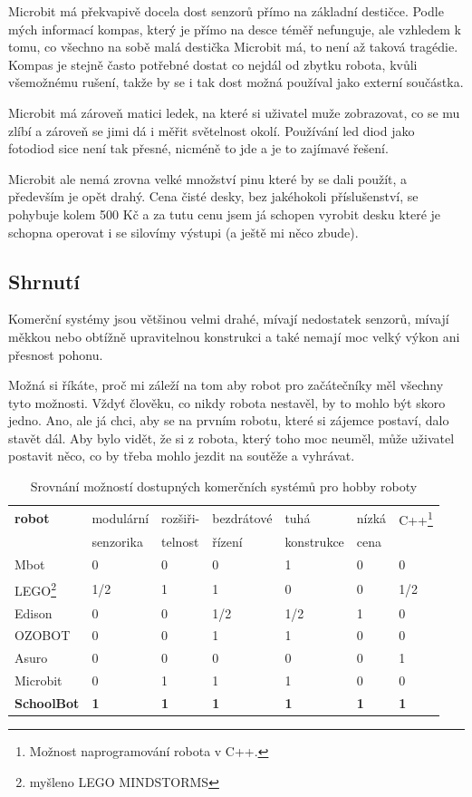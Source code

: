 \documentclass{template/socthesis}
\begin{document}
Microbit má překvapivě docela dost senzorů přímo na základní destičce. Podle mých informací kompas, který je přímo na desce téměř nefunguje, ale vzhledem k tomu, co všechno na sobě malá destička Microbit má, to není až taková tragédie. Kompas je stejně často potřebné dostat co nejdál od zbytku robota, kvůli všemožnému rušení, takže by se i tak dost možná používal jako externí součástka.

Microbit má zároveň matici ledek, na které si uživatel muže zobrazovat, co se mu zlíbí a zároveň se jimi dá i měřit světelnost okolí. Používání led diod jako fotodiod sice není tak přesné, nicméně to jde a je to zajímavé řešení.

Microbit ale nemá zrovna velké množství pinu které by se dali použít, a především je opět drahý. Cena čisté desky, bez jakéhokoli příslušenství, se pohybuje kolem 500 Kč a za tutu cenu jsem já schopen vyrobit desku které je schopna operovat i se silovímy výstupi (a ještě mi něco zbude).


\subsection{Shrnutí}
Komerční systémy jsou většinou velmi drahé, mívají nedostatek senzorů, mívají měkkou nebo obtížně upravitelnou konstrukci a také nemají moc velký výkon ani přesnost pohonu.

Možná si říkáte, proč mi záleží na tom aby robot pro začátečníky měl všechny tyto možnosti. Vždyť člověku, co nikdy robota nestavěl, by to mohlo být skoro jedno. Ano, ale já chci, aby se na prvním robotu, které si zájemce postaví, dalo stavět dál. Aby bylo vidět, že si z robota, který toho moc neuměl, může uživatel postavit něco, co by třeba mohlo jezdit na soutěže a vyhrávat. %

\begin{table}[h]
	\centering
	\begin{tabular}{|l|l|l|l|l|l|l|}
		\hline
		\textbf{robot }			& modulární   & rozšiři- & bezdrátové  & tuhá  & nízká & C++\footnote{Možnost naprogramování robota v C++.} \\
		 & senzorika & telnost & řízení & konstrukce & cena &  \\
		 \hline
		Mbot 			& 0 				& 0 			& 0 			& 1 			& 0			& 0	\\ 
		LEGO\footnote{myšleno LEGO MINDSTORMS} 	& 1/2 				& 1 			& 1 			& 0 			& 0			& 1/2	\\ 
		Edison 			& 0 				& 0 			& 1/2 			& 1/2 			& 1			& 0	\\ 
		OZOBOT			& 0					& 0				& 1 			& 1				& 0			& 0	\\
		Asuro			& 0					& 0				& 0 			& 0				& 0			& 1	\\
		Microbit		& 0					& 1				& 1 			& 1				& 0			& 0	\\
			\textbf{SchoolBot} 		& \textbf{1} 				& \textbf{1} 			& \textbf{1} 			& \textbf{1} 			& \textbf{1} 		& \textbf{1}	\\ 
		\hline
	\end{tabular}
	\caption{Srovnání možností dostupných komerčních systémů pro hobby roboty}
\end{table}
\end{document}

